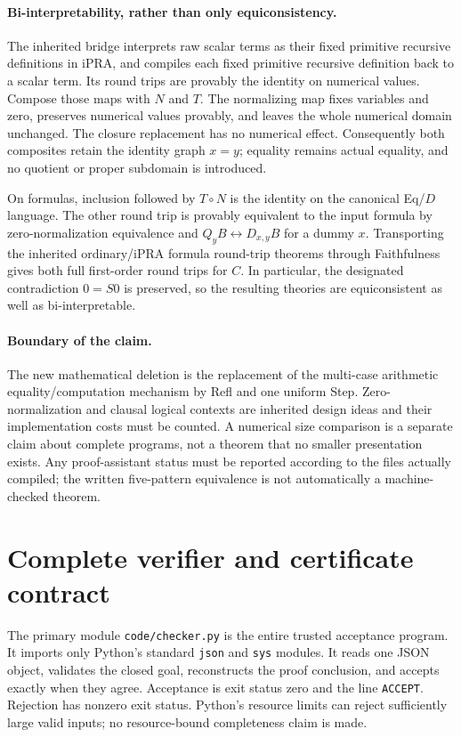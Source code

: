 \documentclass[11pt,letterpaper]{article}
\theoremstyle{definition}
\begin{document}
\paragraph{Bi-interpretability, rather than only equiconsistency.}
The inherited bridge interprets raw scalar terms as their fixed primitive
recursive definitions in iPRA, and compiles each fixed primitive recursive
definition back to a scalar term. Its round trips are provably the identity
on numerical values. Compose those maps with $N$ and $T$. The normalizing
map fixes variables and zero, preserves numerical values provably, and
leaves the whole numerical domain unchanged. The closure replacement has
no numerical effect. Consequently both composites retain the identity
graph $x=y$; equality remains actual equality, and no quotient or proper
subdomain is introduced.

On formulas, inclusion followed by $T\circ N$ is the identity on the
canonical Eq/$D$ language. The other round trip is provably equivalent
to the input formula by zero-normalization equivalence and
$Q_yB\leftrightarrow D_{x,y}B$ for a dummy $x$. Transporting the inherited
ordinary/iPRA formula round-trip theorems through Faithfulness gives both
full first-order round trips for $C$. In particular, the designated
contradiction $0=S0$ is preserved, so the resulting theories are
equiconsistent as well as bi-interpretable.

\paragraph{Boundary of the claim.}
The new mathematical deletion is the replacement of the multi-case
arithmetic equality/computation mechanism by Refl and one uniform Step.
Zero-normalization and clausal logical contexts are inherited design
ideas and their implementation costs must be counted. A numerical size
comparison is a separate claim about complete programs, not a theorem
that no smaller presentation exists. Any proof-assistant status must be
reported according to the files actually compiled; the written
five-pattern equivalence is not automatically a machine-checked theorem.
\section{Complete verifier and certificate contract}
\label{sec:implementation}

The primary module \texttt{code/checker.py} is the entire trusted
acceptance program. It imports only Python's standard \texttt{json} and
\texttt{sys} modules. It reads one JSON object, validates the closed goal,
reconstructs the proof conclusion, and accepts exactly when they agree.
Acceptance is exit status zero and the line \texttt{ACCEPT}. Rejection
has nonzero exit status. Python's resource limits can reject sufficiently
large valid inputs; no resource-bound completeness claim is made.
\end{document}
